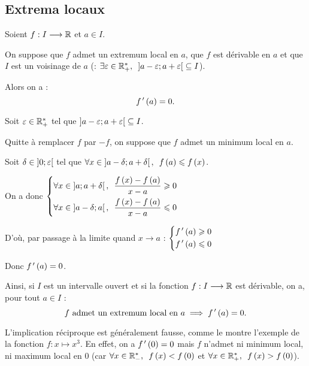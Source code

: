 \subsection{Extrema locaux}

\begin{theo}
Soient \(f:I\longrightarrow\mathbb{R}\) et \(a\in I\).

On suppose que \(f\) admet un extremum local en \(a\), que \(f\) est dérivable en \(a\) et que \(I\) est un voisinage de \(a\) (\cad : \(\quantifs{\exists\epsilon\in\Rps}\intervee{a-\epsilon}{a+\epsilon}\subset I\)).

Alors on a : \[f^{\,\prime}\left(a\right)=0.\]
\end{theo}

\begin{dem}
Soit \(\varepsilon\in\mathbb{R}_+^*\) tel que \(\left]a-\varepsilon;a+\varepsilon\right[\subseteq I\).

Quitte à remplacer \(f\) par \(-f\), on suppose que \(f\) admet un minimum local en \(a\).

Soit \(\delta\in\left]0;\varepsilon\right[\) tel que \(\quantifs{\forall x\in\intervee{a-\delta}{a+\delta}}f\paren{a}\leq f\paren{x}\).

On a donc \(\begin{dcases}\quantifs{\forall x\in\intervee{a}{a+\delta}}\dfrac{f\paren{x}-f\paren{a}}{x-a}\geq0 \\ \quantifs{\forall x\in\intervee{a-\delta}{a}}\dfrac{f\paren{x}-f\paren{a}}{x-a}\leq0\end{dcases}\)

D'où, par passage à la limite quand \(x\to a\) : \(\begin{dcases}f^{\,\prime}\left(a\right)\geqslant0 \\ f^{\,\prime}\left(a\right)\leqslant0\end{dcases}\)

Donc \(f^{\,\prime}\left(a\right)=0\).
\end{dem}

\begin{rem}
Ainsi, si \(I\) est un intervalle ouvert et si la fonction \(f:I\longrightarrow\mathbb{R}\) est dérivable, on a, pour tout \(a\in I\) : \[f\text{ admet un extremum local en }a\implies f^{\,\prime}\left(a\right)=0.\]

L'implication réciproque est généralement fausse, comme le montre l'exemple de la fonction  \(f:x\mapsto x^3\). En effet, on a \(f^{\,\prime}\left(0\right)=0\) mais \(f\) n'admet ni minimum local, ni maximum local en \(0\) (car \(\quantifs{\forall x\in\Rms}f\paren{x}<f\paren{0}\) et \(\quantifs{\forall x\in\Rps}f\paren{x}>f\paren{0}\)).
\end{rem}

